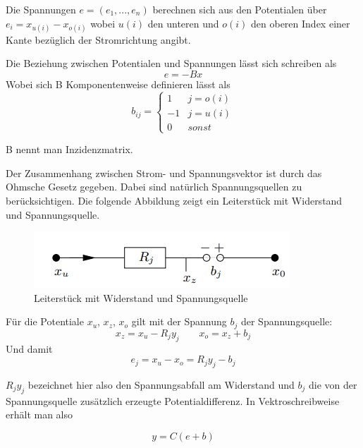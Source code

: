 \documentclass[11pt,titlepage]{article}
\begin{document}
		Die Spannungen $e = (e_1, ..., e_n)$ berechnen sich aus den Potentialen über $e_i = x_{u(i)} - x_{o(i)}$ wobei $u(i)$ den \glqq unteren\grqq{} und $o(i)$ den \glqq oberen\grqq{} Index einer Kante bezüglich der Stromrichtung angibt.
				
		Die Beziehung zwischen Potentialen und Spannungen lässt sich schreiben als 
		\begin{displaymath}
			e = -Bx
		\end{displaymath}
		Wobei sich B Komponentenweise definieren lässt als
		\begin{displaymath}
			b_{ij} = 
			\begin{cases}
				1 &  j = o(i) \\
				-1 &  j = u(i) \\
				0 & sonst				
			\end{cases}
		\end{displaymath}
		
		B nennt man Inzidenzmatrix.
		
		Der Zusammenhang zwischen Strom- und Spannungsvektor ist durch das Ohmsche Gesetz gegeben. Dabei sind natürlich Spannungsquellen zu berücksichtigen. Die folgende Abbildung zeigt ein Leiterstück mit Widerstand und Spannungsquelle.
		
		\begin{figure}[H]
			\centering
			\includegraphics[scale=0.7]{Photos/Example1.png}
			\caption{Leiterstück mit Widerstand und Spannungsquelle}
		\end{figure}
		
		 Für die Potentiale $x_u$, $x_z$, $x_o$ gilt mit der Spannung $b_j$ der Spannungsquelle:
		\begin{displaymath}
			x_z = x_u - R_j y_j \qquad x_o = x_z + b_j
		\end{displaymath}
		Und damit
		\begin{displaymath}
			e_j = x_u - x_o = R_j y_j - b_j
		\end{displaymath}
	
		$R_j y_j$ bezeichnet hier also den Spannungsabfall am Widerstand und $b_j$ die von der Spannungsquelle zusätzlich erzeugte Potentialdifferenz. In Vektroschreibweise erhält man also
		
		\begin{displaymath}
			y = C(e+b)
		\end{displaymath}
		
\end{document}
